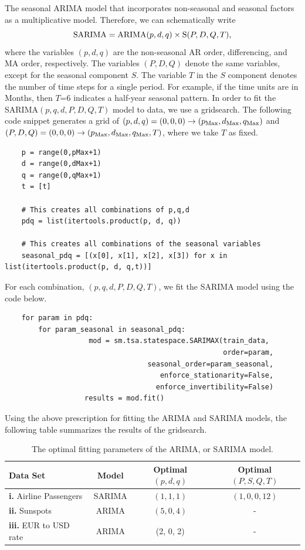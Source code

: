 \documentclass[10pt,a4paper]{article}
\begin{document}
The seasonal ARIMA model that incorporates non-seasonal and seasonal factors as a multiplicative model. Therefore, we can schematically write
\begin{equation}
{\rm SARIMA} = {\rm ARIMA}(p,d,q) \times {\rm S}(P,D,Q,T),
\end{equation}
where the variables $(p,d,q)$ are the non-seasonal AR order, differencing, and MA order, respectively. The variables $(P,D,Q)$ denote the same variables, except for the seasonal component $S$. The variable $T$ in the $S$ component denotes the number of time steps for a single period. For example, if the time units are in Months, then $T$=6 indicates a half-year seasonal pattern. In order to fit the SARIMA$(p,q,d,P,D,Q,T)$ model to data, we use a gridsearch. The following code snippet generates a grid of $(p,d,q)=(0,0,0) \rightarrow (p_{\rm Max},d_{\rm Max},q_{\rm Max}) $ and $(P,D,Q)=(0,0,0) \rightarrow (p_{\rm Max},d_{\rm Max},q_{\rm Max},T) $, where we take $T$ as fixed.
\begin{lstlisting}
	p = range(0,pMax+1)
	d = range(0,dMax+1)
	q = range(0,qMax+1)
	t = [t]
	
	# This creates all combinations of p,q,d
	pdq = list(itertools.product(p, d, q))
	
	# This creates all combinations of the seasonal variables
	seasonal_pdq = [(x[0], x[1], x[2], x[3]) for x in list(itertools.product(p, d, q,t))]
\end{lstlisting}
For each combination, $(p,q,d,P,D,Q,T)$, we fit the SARIMA model using the code below.
\begin{lstlisting}
	for param in pdq:
		for param_seasonal in seasonal_pdq:
					mod = sm.tsa.statespace.SARIMAX(train_data,
                            					    order=param,
                            	  seasonal_order=param_seasonal,
                                     enforce_stationarity=False,
                                    enforce_invertibility=False)
				   results = mod.fit()
\end{lstlisting}


Using the above prescription for fitting the ARIMA and SARIMA models, the following table summarizes the results of the gridsearch.
\begin{table}[h]
\centering
\begin{tabular}{l | c | c | c}
 Data Set    &    Model  & Optimal $(p,d,q)$ &  Optimal $(P,S,Q,T)$ \\ \hline
{\bf i.} Airline Passengers & SARIMA & $(1, 1, 1)$ & $(1, 0, 0, 12)$ \\
{\bf ii.} Sunspots & ARIMA  & $(5,0,4)$ & - \\
{\bf iii.} EUR to USD rate & ARIMA & (2, 0, 2) & - 
\end{tabular}
\caption{The optimal fitting parameters of the ARIMA, or SARIMA model.}
\label{table: optimal fitting parameters ARIMA}
\end{table}
\end{document}
